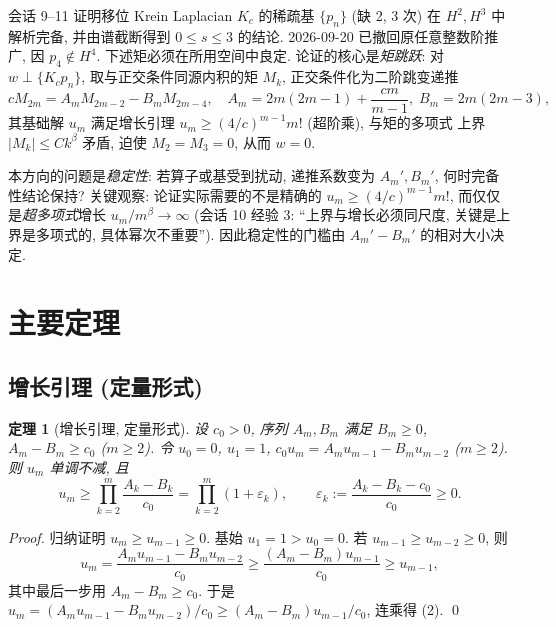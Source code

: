 \documentclass[UTF8]{ctexart}
\newtheorem{theorem}{定理}[section]
\begin{document}
会话 9--11 证明移位 Krein Laplacian $K_c$ 的稀疏基 $\{p_n\}$ (缺 2, 3 次)
在 $H^2,H^3$ 中解析完备, 并由谱截断得到 $0\le s\le3$ 的结论.
2026-09-20 已撤回原任意整数阶推广, 因 $p_4\notin H^4$. 下述矩必须在所用空间中良定.
论证的核心是\emph{矩跳跃}: 对
$w \perp \{K_c p_n\}$, 取与正交条件同源内积的矩 $M_k$, 正交条件化为二阶跳变递推
\begin{equation}
	c M_{2m} = A_m M_{2m-2} - B_m M_{2m-4},
	\quad A_m = 2m(2m-1)+\frac{cm}{m-1},\; B_m = 2m(2m-3),
\end{equation}
其基础解 $u_m$ 满足增长引理 $u_m \geq (4/c)^{m-1} m!$ (超阶乘), 与矩的多项式
上界 $|M_k| \leq C k^\beta$ 矛盾, 迫使 $M_2 = M_3 = 0$, 从而 $w = 0$.

本方向的问题是\emph{稳定性}: 若算子或基受到扰动, 递推系数变为
$A_m', B_m'$, 何时完备性结论保持? 关键观察: 论证实际需要的不是精确的
$u_m \geq (4/c)^{m-1}m!$, 而仅仅是\emph{超多项式}增长 $u_m/m^\beta \to \infty$
(会话 10 经验 3: ``上界与增长必须同尺度, 关键是上界是多项式的, 具体幂次不重要'').
因此稳定性的门槛由 $A_m' - B_m'$ 的相对大小决定.

\section{主要定理}

\subsection{增长引理 (定量形式)}

\begin{theorem}[增长引理, 定量形式]\label{thm:growth}
	设 $c_0 > 0$, 序列 $A_m, B_m$ 满足 $B_m \geq 0$, $A_m - B_m \geq c_0$ ($m \geq 2$).
	令 $u_0 = 0$, $u_1 = 1$, $c_0 u_m = A_m u_{m-1} - B_m u_{m-2}$ ($m \geq 2$).
	则 $u_m$ 单调不减, 且
	\begin{equation}
		u_m \geq \prod_{k=2}^{m} \frac{A_k - B_k}{c_0} = \prod_{k=2}^m (1+\varepsilon_k),
		\qquad \varepsilon_k := \frac{A_k - B_k - c_0}{c_0} \geq 0.
	\end{equation}
\end{theorem}

\begin{proof}
	归纳证明 $u_m \geq u_{m-1} \geq 0$. 基始 $u_1 = 1 > u_0 = 0$. 若
	$u_{m-1} \geq u_{m-2} \geq 0$, 则
	\[
		u_m = \frac{A_m u_{m-1} - B_m u_{m-2}}{c_0}
		\geq \frac{(A_m - B_m)u_{m-1}}{c_0} \geq u_{m-1},
	\]
	其中最后一步用 $A_m - B_m \geq c_0$. 于是
	$u_m = (A_m u_{m-1} - B_m u_{m-2})/c_0 \geq (A_m-B_m)u_{m-1}/c_0$, 连乘得 (2).
	\qed
\end{proof}
\end{document}
